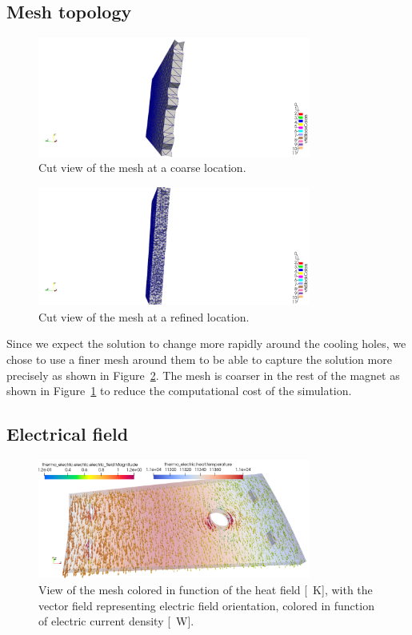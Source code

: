 \documentclass[12pt]{article}
\begin{document}
\subsection{Mesh topology}
\begin{figure}[H]
  \centering
  \includegraphics[width=0.8\textwidth]{images/grossier2.png}
  \caption{Cut view of the mesh at a coarse location.}
  \label{fig:mesh_coarse}
\end{figure}

\begin{figure}[H]
  \centering
  \includegraphics[width=0.8\textwidth]{images/raffiner2.png}
  \caption{Cut view of the mesh at a refined location.}
  \label{fig:mesh_fine}
\end{figure}

Since we expect the solution to change more rapidly around the cooling holes,
we chose to use a finer mesh around them to be able to capture the solution more
precisely as shown in Figure~\ref{fig:mesh_fine}. The mesh is coarser in the
rest of the magnet as shown in Figure~\ref{fig:mesh_coarse} to reduce the computational
cost of the simulation.

\subsection{Electrical field}

\begin{figure}[H]
  \centering
  \includegraphics[width=0.8\textwidth]{images/glyph2.png}
  \caption{View of the mesh colored in function of the heat field [\SI{}{\kelvin}],
    with the vector field representing electric field orientation, colored in function
  of electric current density [\SI{}{\watt}].}
  \label{fig:glyph}
\end{figure}
\end{document}
